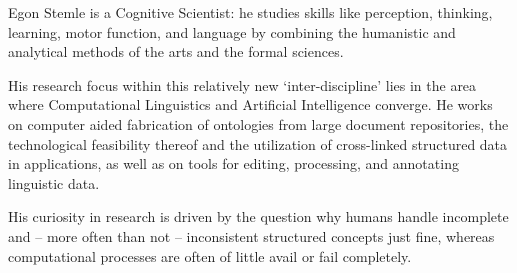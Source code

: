 Egon Stemle is a Cognitive Scientist: he studies skills like perception, thinking, learning, motor function, and language by combining the humanistic and analytical methods of the arts and the formal sciences.

His research focus within this relatively new `inter-discipline' lies in the area where Computational Linguistics and Artificial Intelligence converge. He works on computer aided fabrication of ontologies from large document repositories, the technological feasibility thereof and the utilization of cross-linked structured data in applications, as well as on tools for editing, processing, and annotating linguistic data.

His curiosity in research is driven by the question why humans handle incomplete and -- more often than not -- inconsistent structured concepts just fine, whereas computational processes are often of little avail or fail completely. 
